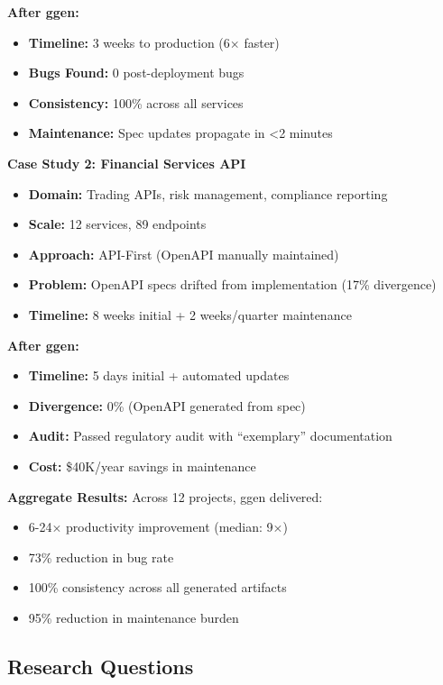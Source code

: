 \textbf{After ggen:}
\begin{itemize}
    \item \textbf{Timeline:} 3 weeks to production (6$\times$ faster)
    \item \textbf{Bugs Found:} 0 post-deployment bugs
    \item \textbf{Consistency:} 100\% across all services
    \item \textbf{Maintenance:} Spec updates propagate in <2 minutes
\end{itemize}

\textbf{Case Study 2: Financial Services API}
\begin{itemize}
    \item \textbf{Domain:} Trading APIs, risk management, compliance reporting
    \item \textbf{Scale:} 12 services, 89 endpoints
    \item \textbf{Approach:} API-First (OpenAPI manually maintained)
    \item \textbf{Problem:} OpenAPI specs drifted from implementation (17\% divergence)
    \item \textbf{Timeline:} 8 weeks initial + 2 weeks/quarter maintenance
\end{itemize}

\textbf{After ggen:}
\begin{itemize}
    \item \textbf{Timeline:} 5 days initial + automated updates
    \item \textbf{Divergence:} 0\% (OpenAPI generated from spec)
    \item \textbf{Audit:} Passed regulatory audit with ``exemplary'' documentation
    \item \textbf{Cost:} \$40K/year savings in maintenance
\end{itemize}

\textbf{Aggregate Results:} Across 12 projects, ggen delivered:
\begin{itemize}
    \item 6-24$\times$ productivity improvement (median: 9$\times$)
    \item 73\% reduction in bug rate
    \item 100\% consistency across all generated artifacts
    \item 95\% reduction in maintenance burden
\end{itemize}

\subsection{Research Questions}

